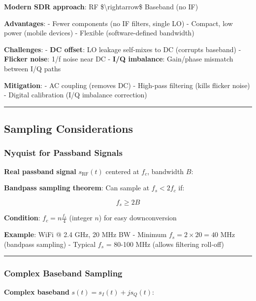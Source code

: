 \textbf{Modern SDR approach}: RF \$\textbackslash rightarrow\$ Baseband
(no IF)

\textbf{Advantages}: - Fewer components (no IF filters, single LO) -
Compact, low power (mobile devices) - Flexible (software-defined
bandwidth)

\textbf{Challenges}: - \textbf{DC offset}: LO leakage self-mixes to DC
(corrupts baseband) - \textbf{Flicker noise}: 1/f noise near DC -
\textbf{I/Q imbalance}: Gain/phase mismatch between I/Q paths

\textbf{Mitigation}: - AC coupling (removes DC) - High-pass filtering
(kills flicker noise) - Digital calibration (I/Q imbalance correction)

\begin{center}\rule{0.5\linewidth}{0.5pt}\end{center}

\subsection{Sampling Considerations}\label{sampling-considerations}

\subsubsection{Nyquist for Passband
Signals}\label{nyquist-for-passband-signals}

\textbf{Real passband signal} \(s_{\text{RF}}(t)\) centered at \(f_c\),
bandwidth \(B\):

\textbf{Bandpass sampling theorem}: Can sample at \(f_s < 2f_c\) if:

\[
f_s \geq 2B
\]

\textbf{Condition}: \(f_c = n \frac{f_s}{4}\) (integer \(n\)) for easy
downconversion

\textbf{Example}: WiFi @ 2.4 GHz, 20 MHz BW - Minimum
\(f_s = 2 \times 20 = 40\) MHz (bandpass sampling) - Typical \(f_s\) =
80-100 MHz (allows filtering roll-off)

\begin{center}\rule{0.5\linewidth}{0.5pt}\end{center}

\subsubsection{Complex Baseband
Sampling}\label{complex-baseband-sampling}

\textbf{Complex baseband} \(s(t) = s_I(t) + j s_Q(t)\):

